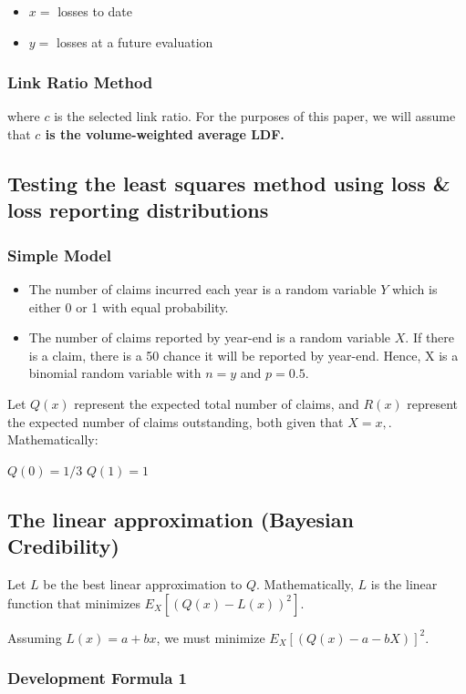 \documentclass{article}
\begin{document}
\begin{itemize}
  \item $x =$ losses to date
  \item $y =$ losses at a future evaluation
\end{itemize}

\subsubsection{Link Ratio Method}
where $c$ is the selected link ratio. For the purposes of this paper, we will
assume that \textbf{$c$ is the volume-weighted average LDF.}

\subsection{Testing the least squares method using loss \& loss
reporting distributions}

\subsubsection{Simple Model}

\begin{itemize}
  \item The number of claims incurred each year is a random variable
    $Y$ which is either 0 or 1 with equal probability.
  \item The number of claims reported by year-end is a random
    variable $X$. If there is a claim, there is a 50 chance it will
    be reported by year-end. Hence, X is a binomial random variable
    with $n = y$ and $p = 0.5$.

\end{itemize}

Let $Q(x)$ represent the expected total number of claims, and $R(x)$
represent the expected number of claims outstanding, both given that
$X=x    ,$. Mathematically:

$Q(0) = 1/3$
$Q(1) = 1$

\subsection{The linear approximation (Bayesian Credibility)}

Let $L$ be the best linear approximation to $Q$. Mathematically, $L$
is the linear function that minimizes $E_{X}[(Q(x) - L(x))^2]$.

Assuming $L(x) = a + bx$, we must minimize $E_{X}[(Q(x) - a - bX)]^2$.

\subsubsection{Development Formula 1}
\end{document}
